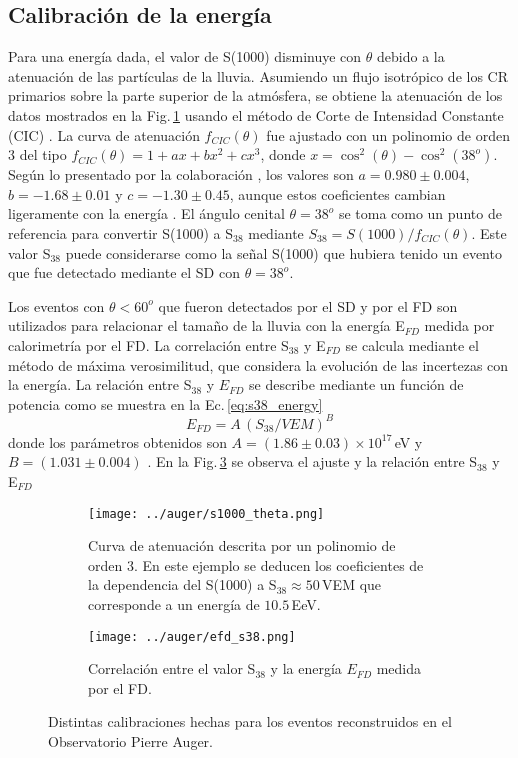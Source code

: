 \subsection{Calibración de la energía}

Para una energía dada, el valor de S(1000) disminuye con $\theta$ debido a la atenuación de las partículas de la lluvia. Asumiendo un flujo isotrópico de los CR primarios sobre la parte superior de la atmósfera, se obtiene la atenuación de los datos mostrados en la Fig.\,\ref{fig:s1000_theta}  usando el método de Corte de Intensidad Constante (CIC) \cite{CIC}. La curva de atenuación $f_{CIC}(\theta)$ fue ajustado con un polinomio de orden 3 del tipo $f_{CIC}(\theta)=1+ax+bx^2+cx^3$, donde $x=\cos^2(\theta) - \cos^2(38^o)$. Según lo presentado por la colaboración \cite{collaboration2013pierre}, los valores son $a=0.980\pm0.004$, $b=-1.68\pm0.01$ y $c=-1.30\pm 0.45$, aunque estos coeficientes cambian ligeramente con la energía \cite{data}. El ángulo cenital $\theta=38^o$ se toma como un punto de referencia para convertir S(1000) a S$_{38}$ mediante $S_{38}=S(1000)/f_{CIC}(\theta)$. Este valor S$_{38}$ puede considerarse como la señal S(1000) que hubiera tenido un evento que fue detectado mediante el SD con $\theta=38^o$.

Los eventos con $\theta<60^o$  que fueron detectados por el SD y por el FD son utilizados para relacionar el tamaño de la lluvia con la energía  E$_{FD}$ medida por calorimetría por el FD.  La correlación entre S$_{38}$ y E$_{FD}$ se calcula mediante el método de máxima verosimilitud, que considera la evolución de las incertezas con la energía. La relación entre S$_{38}$ y $E_{FD}$ se describe mediante un función de potencia como se muestra en la Ec.\,\ref{eq:s38_energy}
\begin{equation}
	E_{FD}= A\, (S_{38}/VEM)^B
	\label{eq:s38_energy}
\end{equation}
donde los parámetros obtenidos son $A=(1.86\pm0.03)\times 10^{17}\,$eV y $B=(1.031\pm0.004)$  \cite{tobepublished}. En la Fig.\,\ref{fig:efd_s38} se observa el ajuste y la relación entre  S$_{38}$ y E$_{FD}$


\begin{figure}[H]
    \begin{subfigure}[t]{0.51\textwidth}
	\texttt{[image: ../auger/s1000\_theta.png]}
	\caption{Curva de atenuación descrita por un polinomio de orden 3. En este ejemplo se deducen los coeficientes de la dependencia del S(1000) a S$_{38}\approx 50\,$VEM que corresponde a un energía de $10.5\,$EeV.} 	\label{fig:s1000_theta}
    \end{subfigure}%
    \hspace{\fill}
    \begin{subfigure}[t]{0.45\textwidth}
	\texttt{[image: ../auger/efd\_s38.png]}
	\caption{Correlación entre el valor S$_{38}$ y la energía $E_{FD}$ medida por el FD.} 	\label{fig:efd_s38}
    \end{subfigure}%
    \caption{Distintas calibraciones hechas para los eventos reconstruidos en el Observatorio Pierre Auger.}
	\end{figure}



